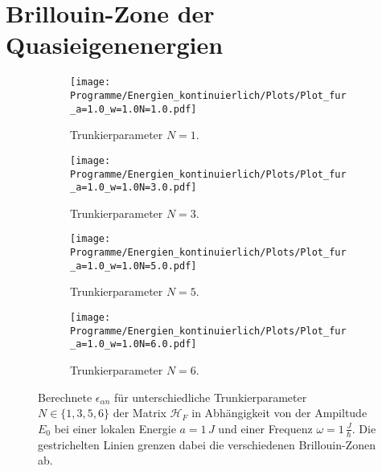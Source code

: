 \section{Brillouin-Zone der Quasieigenenergien}
\begin{figure}
  \centering
  \begin{subfigure}{0.48\textwidth}
    \texttt{[image: Programme/Energien\_kontinuierlich/Plots/Plot\_fur\_a=1.0\_w=1.0N=1.0.pdf]}
    \caption{Trunkierparameter $N=1$.}
    \label{fig=N_1}
  \end{subfigure}
  \begin{subfigure}{0.48\textwidth}
    \texttt{[image: Programme/Energien\_kontinuierlich/Plots/Plot\_fur\_a=1.0\_w=1.0N=3.0.pdf]}
    \caption{Trunkierparameter $N=3.$}
    \label{fig=N_3}
  \end{subfigure}
  \begin{subfigure}{0.48\textwidth}
    \texttt{[image: Programme/Energien\_kontinuierlich/Plots/Plot\_fur\_a=1.0\_w=1.0N=5.0.pdf]}
    \caption{Trunkierparameter $N=5$.}
    \label{fig=N_5}
  \end{subfigure}
  \begin{subfigure}{0.48\textwidth}
    \texttt{[image: Programme/Energien\_kontinuierlich/Plots/Plot\_fur\_a=1.0\_w=1.0N=6.0.pdf]}
    \caption{Trunkierparameter $N=6$.}
    \label{fig=N_6}
  \end{subfigure}
  \caption{Berechnete $\epsilon_{\alpha n}$ für unterschiedliche
  Trunkierparameter $N\in\{1,3,5,6\}$
  der Matrix $\mathcal{H}_F$ in Abhängigkeit von der Ampiltude $E_0$
  bei einer lokalen Energie $a=1\,J$ und einer Frequenz
  $\omega=1\,\frac{J}{\hbar}$. Die gestrichelten Linien grenzen dabei
  die verschiedenen Brillouin-Zonen ab.}
  \label{fig:brillouin}
\end{figure}



\newpage
